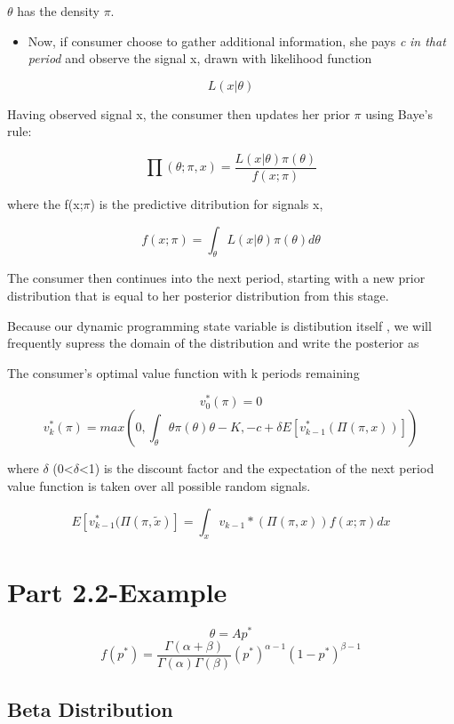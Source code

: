 \documentclass[
]{book}
\providecommand{\tightlist}{%
  \setlength{\itemsep}{0pt}\setlength{\parskip}{0pt}}
\begin{document}
\(\theta\) has the density \(\pi\).

\begin{itemize}
\tightlist
\item
  Now, if consumer choose to gather additional information, she pays \emph{c} \emph{in that period} and observe the signal x, drawn with likelihood function
\end{itemize}

\[L(x|\theta)\]

Having observed signal x, the consumer then updates her prior \(\pi\) using Baye's rule:

\[\prod(\theta;\pi,x) = \frac{L(x|\theta)\pi(\theta)}{f(x;\pi)} \]

where the f(x;\(\pi\)) is the predictive ditribution for signals x,

\[f(x;\pi) =\int_{\theta} L(x|\theta)\pi(\theta)d\theta\]

The consumer then continues into the next period, starting with a new prior distribution that is equal to her posterior distribution from this stage.

Because our dynamic programming state variable is distibution itself , we will frequently supress the domain of the distribution and write the posterior as

The consumer's optimal value function with k periods remaining

\[v^{*}_{0}(\pi) = 0\]
\[v^{*}_{k}(\pi)=max(0,\int_{\theta}\theta\pi(\theta) \theta -K , -c + \delta E[v^{*}_{k-1}(\Pi(\pi,x))])\]

where \(\delta\) (0\textless{}\(\delta\)\textless1) is the discount factor and the expectation of the next period value function is taken over all possible random signals.

\[E[v^{*}_{k-1}(\Pi(\pi, \tilde{x})]=\int_{x}v_{k-1}{*}(\Pi(\pi,x))f(x;\pi)dx\]

\hypertarget{part-2.2-example}{%
\chapter{Part 2.2-Example}\label{part-2.2-example}}

\[\theta=Ap^*\]
\[f(p^*) = \frac{\Gamma(\alpha + \beta)}{\Gamma(\alpha)\Gamma(\beta)}(p^*)^{\alpha-1}(1-p^*)^{\beta-1}\]

\hypertarget{beta-distribution}{%
\section{Beta Distribution}\label{beta-distribution}}
\end{document}
